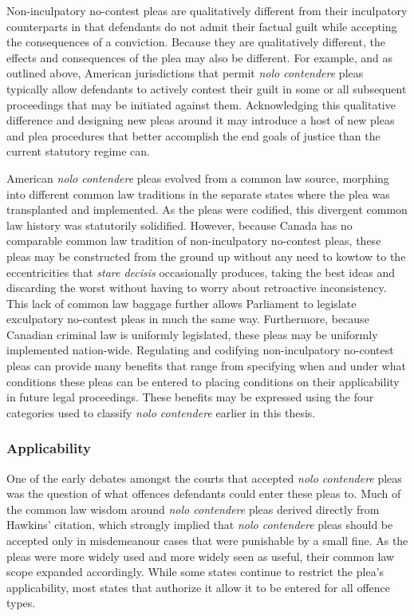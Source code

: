 Non-inculpatory no-contest pleas are qualitatively different from their inculpatory counterparts in that defendants do not admit their factual guilt while accepting the consequences of a conviction. Because they are qualitatively different, the effects and consequences of the plea may also be different. For example, and as outlined above, American jurisdictions that permit \textit{nolo contendere} pleas typically allow defendants to actively contest their guilt in some or all subsequent proceedings that may be initiated against them. Acknowledging this qualitative difference and designing new pleas around it may introduce a host of new pleas and plea procedures that better accomplish the end goals of justice than the current statutory regime can.

American \textit{nolo contendere} pleas evolved from a common law source, morphing into different common law traditions in the separate states where the plea was transplanted and implemented. As the pleas were codified, this divergent common law history was statutorily solidified. However, because Canada has no comparable common law tradition of non-inculpatory no-contest pleas, these pleas may be constructed from the ground up without any need to kowtow to the eccentricities that \textit{stare decisis} occasionally produces, taking the best ideas and discarding the worst without having to worry about retroactive inconsistency. This lack of common law baggage further allows Parliament to legislate exculpatory no-contest pleas in much the same way. Furthermore, because Canadian criminal law is uniformly legislated, these pleas may be uniformly implemented nation-wide. Regulating and codifying non-inculpatory no-contest pleas can provide many benefits that range from specifying when and under what conditions these pleas can be entered to placing conditions on their applicability in future legal proceedings. These benefits may be expressed using the four categories used to classify \textit{nolo contendere} earlier in this thesis.

\subsubsection{Applicability}

One of the early debates amongst the courts that accepted \textit{nolo contendere} pleas was the question of what offences defendants could enter these pleas to. Much of the common law wisdom around \textit{nolo contendere} pleas derived directly from Hawkins' citation, which strongly implied that \textit{nolo contendere} pleas should be accepted only in misdemeanour cases that were punishable by a small fine. As the pleas were more widely used and more widely seen as useful, their common law scope expanded accordingly. While some states continue to restrict the plea's applicability, most states that authorize it allow it to be entered for all offence types.

